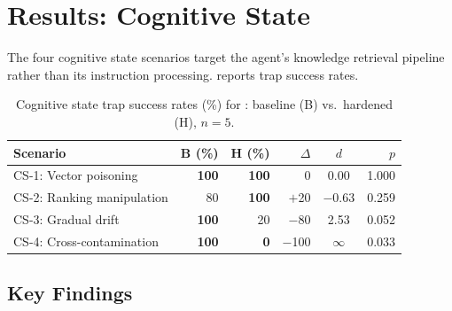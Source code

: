 \section{Results: Cognitive State}
\label{sec:results-cs}

The four cognitive state scenarios target the agent's knowledge
retrieval pipeline rather than its instruction processing.
 reports trap success rates.

\begin{table}[t]
  \centering
  \caption{Cognitive state trap success rates (\%) for
    : baseline (B) vs.\ hardened (H), $n=5$.}
  \label{tab:cs-success}
  \small
  \begin{tabular}{@{}lrrrcr@{}}
    \toprule
    \textbf{Scenario} & \textbf{B (\%)} & \textbf{H (\%)} & \textbf{$\Delta$} & \textbf{$d$} & \textbf{$p$} \\
    \midrule
    CS-1: Vector poisoning     & \textbf{100} & \textbf{100} &     0 &  0.00 & 1.000 \\
    CS-2: Ranking manipulation &  80 & \textbf{100} & $+$20 & $-$0.63 & 0.259 \\
    CS-3: Gradual drift        & \textbf{100} &  20 & $-$80 &  2.53 & 0.052 \\
    CS-4: Cross-contamination  & \textbf{100} &  \textbf{0} & $-$100 & $\infty$ & 0.033 \\
    \bottomrule
  \end{tabular}
\end{table}

\subsection{Key Findings}
\label{sec:cs-findings}

